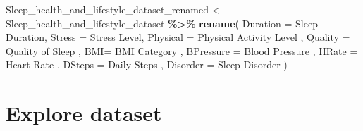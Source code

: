 \documentclass[
  11pt,
]{article}
\newenvironment{Shaded}{\begin{snugshade}}{\end{snugshade}}
\newcommand{\AttributeTok}[1]{\textcolor[rgb]{0.13,0.29,0.53}{#1}}
\newcommand{\FunctionTok}[1]{\textcolor[rgb]{0.13,0.29,0.53}{\textbf{#1}}}
\newcommand{\NormalTok}[1]{#1}
\newcommand{\OtherTok}[1]{\textcolor[rgb]{0.56,0.35,0.01}{#1}}
\newcommand{\SpecialCharTok}[1]{\textcolor[rgb]{0.81,0.36,0.00}{\textbf{#1}}}
\newcommand{\StringTok}[1]{\textcolor[rgb]{0.31,0.60,0.02}{#1}}
\begin{document}
\begin{Shaded}
\begin{Highlighting}[]
\NormalTok{Sleep\_health\_and\_lifestyle\_dataset\_renamed }\OtherTok{\textless{}{-}}\NormalTok{ Sleep\_health\_and\_lifestyle\_dataset }\SpecialCharTok{\%\textgreater{}\%}
  \FunctionTok{rename}\NormalTok{( }\AttributeTok{Duration =} \StringTok{\textquotesingle{}Sleep Duration\textquotesingle{}}\NormalTok{,}
          \AttributeTok{Stress =} \StringTok{\textquotesingle{}Stress Level\textquotesingle{}}\NormalTok{,}
          \AttributeTok{Physical =} \StringTok{\textquotesingle{}Physical Activity Level\textquotesingle{}}\NormalTok{ ,}
          \AttributeTok{Quality =} \StringTok{\textquotesingle{}Quality of Sleep\textquotesingle{}}\NormalTok{ ,}
          \AttributeTok{BMI=} \StringTok{\textquotesingle{}BMI Category\textquotesingle{}}\NormalTok{ ,}
          \AttributeTok{BPressure =} \StringTok{\textquotesingle{}Blood Pressure\textquotesingle{}}\NormalTok{ ,}
          \AttributeTok{HRate =} \StringTok{\textquotesingle{}Heart Rate\textquotesingle{}}\NormalTok{ ,}
          \AttributeTok{DSteps =} \StringTok{\textquotesingle{}Daily Steps\textquotesingle{}}\NormalTok{ ,}
          \AttributeTok{Disorder =} \StringTok{\textquotesingle{}Sleep Disorder\textquotesingle{}}\NormalTok{ )}
\end{Highlighting}
\end{Shaded}

\begin{Shaded}
\end{Shaded}

\hypertarget{explore-dataset}{%
\section{Explore dataset}\label{explore-dataset}}
\end{document}
